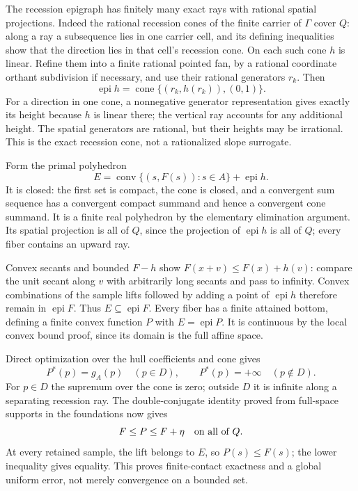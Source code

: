 \documentclass[
  11pt,
]{article}
\begin{document}
The recession epigraph has finitely many exact rays with rational
spatial projections. Indeed the rational recession cones of the finite
carrier of \(\Gamma\) cover \(Q\): along a ray a subsequence lies in one
carrier cell, and its defining inequalities show that the direction lies
in that cell's recession cone. On each such cone \(h\) is linear. Refine
them into a finite rational pointed fan, by a rational coordinate
orthant subdivision if necessary, and use their rational generators
\(r_k\). Then
\[ \operatorname{epi}h=\operatorname{cone}\{(r_k,h(r_k)),(0,1)\}. \] For
a direction in one cone, a nonnegative generator representation gives
exactly its height because \(h\) is linear there; the vertical ray
accounts for any additional height. The spatial generators are rational,
but their heights may be irrational. This is the exact recession cone,
not a rationalized slope surrogate.

Form the primal polyhedron
\[ E=\operatorname{conv}\{(s,F(s)):s\in A\}+\operatorname{epi}h. \] It
is closed: the first set is compact, the cone is closed, and a
convergent sum sequence has a convergent compact summand and hence a
convergent cone summand. It is a finite real polyhedron by the
elementary elimination argument. Its spatial projection is all of \(Q\),
since the projection of \(\operatorname{epi}h\) is all of \(Q\); every
fiber contains an upward ray.

Convex secants and bounded \(F-h\) show \(F(x+v)\leq F(x)+h(v)\):
compare the unit secant along \(v\) with arbitrarily long secants and
pass to infinity. Convex combinations of the sample lifts followed by
adding a point of \(\operatorname{epi}h\) therefore remain in
\(\operatorname{epi}F\). Thus \(E\subseteq\operatorname{epi}F\). Every
fiber has a finite attained bottom, defining a finite convex function
\(P\) with \(E=\operatorname{epi}P\). It is continuous by the local
convex bound proof, since its domain is the full affine space.

Direct optimization over the hull coefficients and cone gives
\[ P^*(p)=g_A(p)\quad(p\in D),\qquad P^*(p)=+\infty\quad(p\notin D). \]
For \(p\in D\) the supremum over the cone is zero; outside \(D\) it is
infinite along a separating recession ray. The double-conjugate identity
proved from full-space supports in the foundations now gives
\[ F\leq P\leq F+\eta\quad\hbox{on all of }Q. \] At every retained
sample, the lift belongs to \(E\), so \(P(s)\leq F(s)\); the lower
inequality gives equality. This proves finite-contact exactness and a
global uniform error, not merely convergence on a bounded set.
\end{document}
